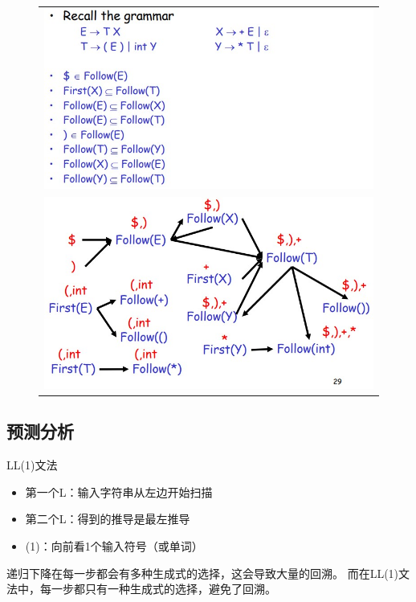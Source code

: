 \begin{figure}[H]
\centering
\begin{tabular}{c}
\includegraphics[width=0.8\linewidth]{fig/follow_eg1.jpg}\\
\includegraphics[width=0.8\linewidth]{fig/follow_eg2.jpg}
\end{tabular}
\end{figure}

\subsection{预测分析}
LL(1)文法
\begin{itemize}
	\item 第一个L：输入字符串从左边开始扫描
	\item 第二个L：得到的推导是最左推导
	\item (1)：向前看1个输入符号（或单词）
\end{itemize}

递归下降在每一步都会有多种生成式的选择，这会导致大量的回溯。
而在LL(1)文法中，每一步都只有一种生成式的选择，避免了回溯。

